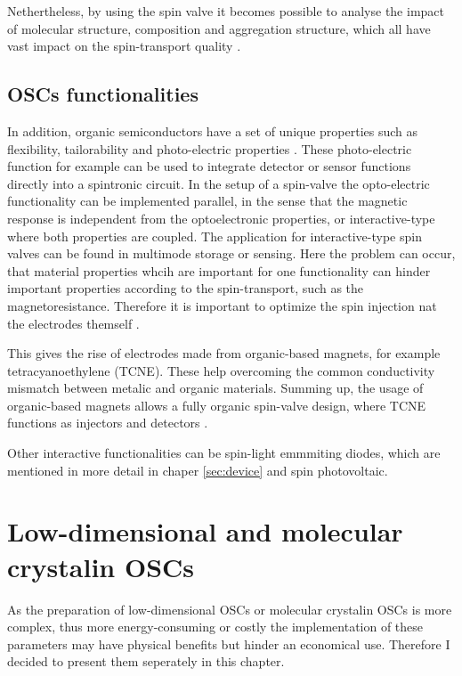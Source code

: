 Nethertheless, by using the spin valve it becomes possible to analyse the impact of molecular structure, composition and aggregation structure, which all have vast impact on the spin-transport quality \cite{appl-organic}.

\subsection{OSCs functionalities}

In addition, organic semiconductors have a set of unique properties such as flexibility, tailorability and photo-electric properties \cite{appl-organic}.
These photo-electric function for example can be used to integrate detector or sensor functions directly into a spintronic circuit.
In the setup of a spin-valve the opto-electric functionality can be implemented parallel, in the sense that the magnetic response is independent from the optoelectronic properties, or interactive-type where both properties are coupled.
The application for interactive-type spin valves can be found in multimode storage or sensing.
Here the problem can occur, that material properties whcih are important for one functionality can hinder important properties according to the spin-transport, such as the magnetoresistance.
Therefore it is important to optimize the spin injection nat the electrodes themself \cite{perovskite}.

This gives the rise of electrodes made from organic-based magnets, for example tetracyanoethylene (TCNE).
These help overcoming the common conductivity mismatch between metalic and organic materials.
Summing up, the usage of organic-based magnets allows a fully organic spin-valve design, where TCNE functions as injectors and detectors \cite{perovskite}.

Other interactive functionalities can be spin-light emmmiting diodes, which are mentioned in more detail in chaper \ref{sec:device} and spin photovoltaic.


\section{Low-dimensional and molecular crystalin OSCs}
\label{sec:2D}

As the preparation of low-dimensional OSCs or molecular crystalin OSCs is more complex, thus more energy-consuming or costly the implementation of these parameters may have physical benefits but hinder an economical use.
Therefore I decided to present them seperately in this chapter.

